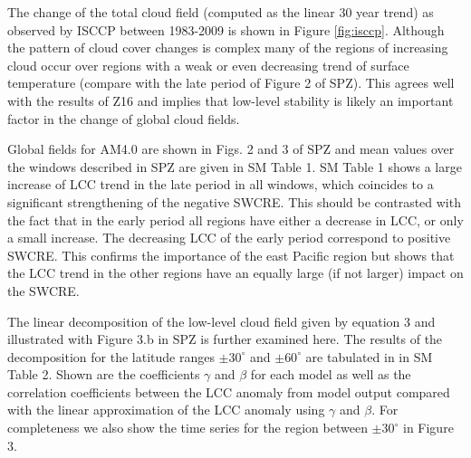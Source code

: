 \documentclass[draft,grl]{agutexSI}
\begin{document}
\begin{article}
The change of the total cloud field (computed as the linear 30 year trend)  as observed by ISCCP between 1983-2009 is shown in Figure \ref{fig:isccp}.  Although the pattern of cloud cover changes is complex many of the regions of increasing cloud occur over regions with a weak or even decreasing trend of surface temperature (compare with the late period of Figure 2 of SPZ).  This agrees well with the results of Z16 and implies that low-level stability is likely an important factor in the change of global cloud fields.  

Global fields for AM4.0 are shown in Figs. 2 and 3 of SPZ and mean values over the windows described in SPZ are given in SM Table 1.  
SM Table 1 shows a large increase of LCC trend in the late period in all windows, which coincides to a significant strengthening of the negative SWCRE.  
This should be contrasted with the fact that in the early period all regions have either a decrease in LCC, or only a small increase.  The decreasing LCC of the early period correspond to positive SWCRE.  This confirms the importance of the east Pacific region but shows that the LCC trend in the other regions have an equally large (if not larger) impact on the SWCRE.  

The linear decomposition of the low-level cloud field given by equation 3 and illustrated with Figure 3.b in SPZ is further examined here.  The results of the decomposition for the latitude ranges $\pm 30^{\circ}$ and $\pm 60^{\circ}$ are tabulated in in SM Table 2.  Shown are the coefficients $\gamma$ and $\beta$ for each model as well as the correlation coefficients between the LCC anomaly from model output compared with the linear approximation of the LCC anomaly using $\gamma$ and $\beta$.  For completeness we also show the time series for the region between $\pm 30^{\circ}$ in Figure 3.  


\end{article}
\end{document}
